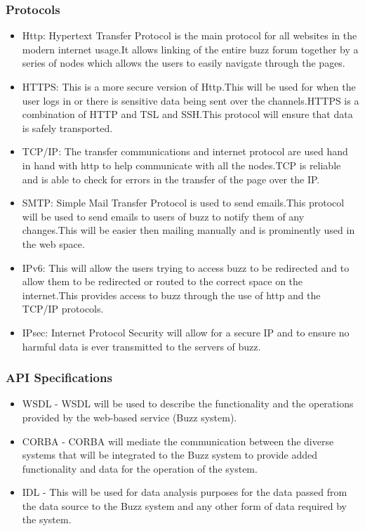 \subsubsection{Protocols}
\begin{itemize}
\item Http: Hypertext Transfer Protocol is the main protocol for all websites in the modern internet usage.It allows linking of the entire buzz forum together by a series of nodes which allows the users to easily navigate through the pages.
\item HTTPS: This is a more secure version of Http.This will be used for when the user logs in or there is sensitive data being sent over the channels.HTTPS is a combination of HTTP and TSL and SSH.This protocol will ensure that data is safely transported.
\item TCP/IP: The transfer communications and internet protocol are used hand in hand with http to help communicate with all the nodes.TCP is reliable and is able to check for errors in the transfer of the page over the IP.
\item SMTP: Simple Mail Transfer Protocol is used to send emails.This protocol will be used to send emails to users of buzz to notify them of any changes.This will be easier then mailing manually and is prominently used in the web space.
\item IPv6: This will allow the users trying to  access buzz to be redirected and to allow them to be redirected or routed to the correct space on the internet.This provides access to buzz through the use of http and the TCP/IP protocols.
\item IPsec: Internet Protocol Security will allow for a secure IP and to ensure no harmful data is ever transmitted to the servers of buzz.
\end{itemize}

\subsubsection{API Specifications}
\begin{itemize}
\item WSDL - WSDL will be used to describe the functionality and the operations provided by the web-based service (Buzz system).
\item CORBA - CORBA will mediate the communication between the diverse systems that will be integrated to the Buzz system to provide added functionality and data for the operation of the system.
\item IDL - This will be used for data analysis purposes for the data passed from the data source to the Buzz system and any other form of data required by the system.
\end{itemize}

